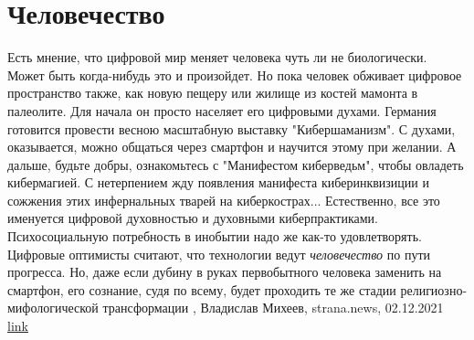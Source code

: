  
 
 
 
 
\chapter{Человечество}
\label{sec:slova.chelovechestvo}

Есть мнение, что цифровой мир меняет человека чуть ли не биологически. Может
быть когда-нибудь это и произойдет. Но пока человек обживает цифровое
пространство также, как новую пещеру или жилище из костей мамонта в палеолите.
Для начала он просто населяет его цифровыми духами. Германия готовится провести
весною масштабную выставку "Кибершаманизм". С духами, оказывается, можно
общаться через смартфон и научится этому при желании. А дальше, будьте добры,
ознакомьтесь с "Манифестом киберведьм", чтобы овладеть кибермагией.  С
нетерпением жду появления манифеста киберинквизиции и сожжения этих
инфернальных тварей на киберкострах...  Естественно, все это именуется цифровой
духовностью и духовными киберпрактиками. Психосоциальную потребность в инобытии
надо же как-то удовлетворять.  Цифровые оптимисты считают, что технологии ведут
\emph{человечество} по пути прогресса. Но, даже если дубину в руках первобытного
человека заменить на смартфон, его сознание, судя по всему, будет проходить те
же стадии религиозно- мифологической трансформации
, 
Владислав Михеев, strana.news, 02.12.2021
\href{https://strana.news/opinions/365165-mir-pohruzhaetsja-v-tsifrovuju-mahiju-i-mistiku.html}{link}
